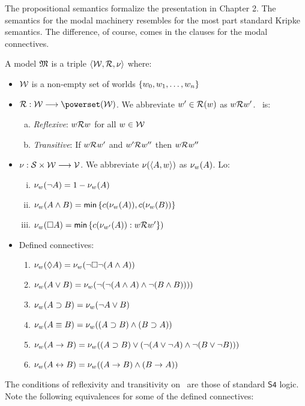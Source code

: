 The propositional semantics formalize the presentation in Chapter 2. The semantics for the modal machinery resembles for the most part standard Kripke semantics. The difference, of course, comes in the clauses for the modal connectives.

\begin{singlespace}
A model $ \Model $ is a triple $ \tuple{ \Worlds, \Access, \val } $ where:

\begin{itemize}
	\item $ \Worlds $ is a non-empty set of worlds $ \set{ w_0, w_1, \dots, w_n } $
	\item $ \Access : \Worlds \into \powerset(\Worlds) $. We abbreviate $ \sees{ w }{ w' } $ as $ \Sees{ w }{ w' } $. \Access\ is:
	\begin{enumerate}[(a)]
		\item \emph{Reflexive}: $ \Sees{ w }{ w } $ for all $ w \in \Worlds $
		\item \emph{Transitive}: If $ \Sees{ w }{ w' } $ and $ \Sees{ w' }{ w'' }$ then $ \Sees{ w }{ w'' } $
	\end{enumerate}
	\item $ \val : \Sentences \times \Worlds \into \Values $. We abbreviate $ \valw{ A }{ w } $ as $ \Valw{ w }{ A } $. Lo:
	\begin{enumerate}[(i)]
		\item $ \Valw{ w }{ \neg A } 		= 1 - \Valw{ w }{ A } $
		\item $ \Valw{ w }{ A \wedge B } 	= \Min{ c( \Valw{ w }{ A } ), c( \Valw{ w }{ B } ) } $
		\item $ \Valw{ w }{ \Box A } 		= \Min{ c( \Valw{ w' }{ A } ) : \Sees{ w }{ w' } } ) $ 
	\end{enumerate}
	\item Defined connectives:
	\begin{enumerate}
		\item $ \Valw{ w }{ \Diam A } 		= \Valw{ w }{ \neg \Box \neg ( A \wedge A ) }$ 
		\item $ \Valw{ w }{ A \vee B } 		= \Valw{ w }{ \neg ( \neg( A \wedge A ) \wedge \neg( B \wedge B ))) } $
		\item $ \Valw{ w }{ A \supset B } 	= \Valw{ w }{ \neg A \vee B } $
		\item $ \Valw{ w }{ A \equiv B } 	= \Valw{ w }{ (A \supset B) \wedge (B \supset A)} $
		\item $ \Valw{ w }{ A \arrow B } = \Valw{ w }{ (A \supset B ) \vee (\neg(A\vee\neg A) \wedge \neg(B\vee\neg B)) } $
		\item $ \Valw{ w }{ A \biarrow B } 	= \Valw{ w }{ (A \arrow B) \wedge (B \arrow A) } $
	\end{enumerate}
\end{itemize}
\end{singlespace}
%
The conditions of reflexivity and transitivity on \Access\ are those of standard $\mathsf{S4}$ logic. Note the following equivalences for some of the defined connectives:

